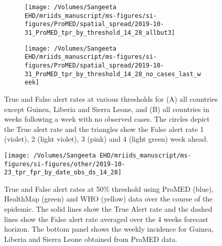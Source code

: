 \documentclass[9pt,twoside,lineno]{pnas-new}
\begin{document}
\begin{figure}
\centering
\begin{subfigure}[b]{0.45\textwidth}
\texttt{[image: /Volumes/Sangeeta EHD/mriids\_manuscript/ms-figures/si-figures/ProMED/spatial\_spread/2019-10-31\_ProMED\_tpr\_by\_threshold\_14\_28\_allbut3]}
\end{subfigure}
\begin{subfigure}[b]{0.45\textwidth}
\texttt{[image: /Volumes/Sangeeta
  EHD/mriids\_manuscript/ms-figures/si-figures/ProMED/spatial\_spread/2019-10-31\_ProMED\_tpr\_by\_threshold\_14\_28\_no\_cases\_last\_week]}
\end{subfigure}
\caption{True and False alert rates at various thresholds for (A) all
  countries except Guinea, Liberia and Sierra Leone, and (B) all
  countries in weeks following a week with no observed cases. The
  circles depict the True alert rate and the triangles show the False
  alert rate 1 (violet), 2 (light violet), 3 (pink) and 4
  (light green) week ahead.}
\label{fig:tprbythreshold}
\end{figure}\FloatBarrier


\begin{figure}
\centering
\texttt{[image: /Volumes/Sangeeta EHD/mriids\_manuscript/ms-figures/si-figures/other/2019-10-23\_tpr\_fpr\_by\_date\_obs\_ds\_14\_28]}
\caption{True and False alert rates at 50\% threshold using ProMED
  (blue), HealthMap (green) and WHO (yellow) data 
  over the course of the epidemic. The solid lines show the True Alert
rate and the dashed lines show the False alert rate
averaged over the 4 weeks forecast horizon. The bottom panel shows the
weekly incidence for Guinea, Liberia and Sierra Leone obtained from
ProMED data.}
\label{fig:tprovertime}
\end{figure}\FloatBarrier
\end{document}
